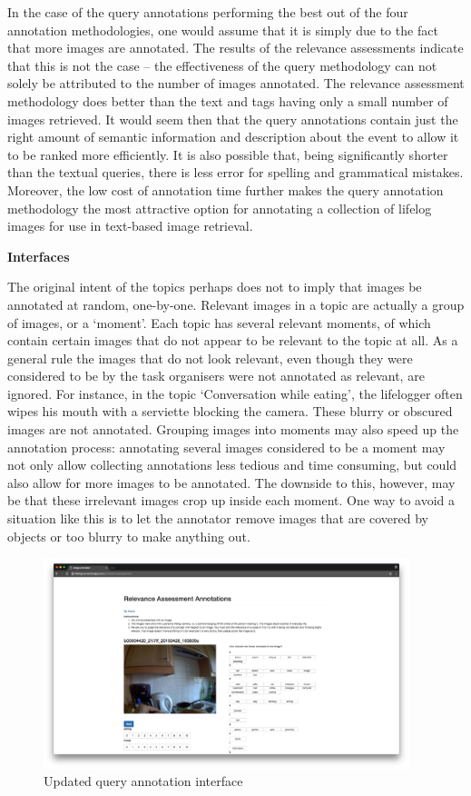 In the case of the query annotations performing the best out of the four annotation methodologies, one would assume that it is simply due to the fact that more images are annotated. The results of the relevance assessments indicate that this is not the case -- the effectiveness of the query methodology can not solely be attributed to the number of images annotated. The relevance assessment methodology does better than the text and tags having only a small number of images retrieved. It would seem then that the query annotations contain just the right amount of semantic information and description about the event to allow it to be ranked more efficiently. It is also possible that, being significantly shorter than the textual queries, there is less error for spelling and grammatical mistakes. Moreover, the low cost of annotation time further makes the query annotation methodology the most attractive option for annotating a collection of lifelog images for use in text-based image retrieval.

\textbf{Interfaces}

The original intent of the topics perhaps does not to imply that images be annotated at random, one-by-one. Relevant images in a topic are actually a group of images, or a `moment'. Each topic has several relevant moments, of which  contain certain images that do not appear to be relevant to the topic at all. As a general rule the images that do not look relevant, even though they were considered to be by the task organisers were not annotated as relevant, are ignored. For instance, in the topic `Conversation while eating', the lifelogger often wipes his mouth with a serviette blocking the camera. These blurry or obscured images are not annotated. Grouping images into moments may also speed up the annotation process: annotating several images considered to be a moment may not only allow collecting annotations less tedious and time consuming, but could also allow for more images to be annotated. The downside to this, however, may be that these irrelevant images crop up inside each moment. One way to avoid a situation like this is to let the annotator remove images that are covered by objects or too blurry to make anything out.

\begin{figure}[h]
    \centering
    \includegraphics[width=0.95\textwidth]{images/new-rel-ass-interface}
    \caption{Updated query annotation interface}
    \label{fig:new-rel-ass}
\end{figure}

